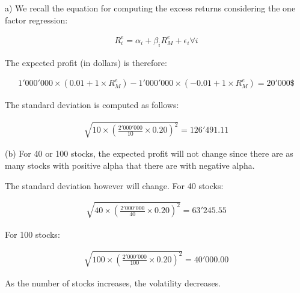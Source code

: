 \documentclass[10pt]{article}
\newenvironment{exercise}[2][Exercise]{\begin{trivlist}
  \item[\hskip \labelsep {\bfseries #1}\hskip \labelsep {\bfseries #2.}]}{\end{trivlist}}
\begin{document}
\begin{exercise}{2}

	(a) We recall the equation for computing the excess returns considering the one factor regression:
	
	\begin{align*}
		R_{i}^{e} = \alpha_{i} + \beta_{i}R_{M}^{e}  + \epsilon_{i} \forall i
	\end{align*}
	
	The expected profit (in dollars) is therefore:
	
	\begin{align*}
		1'000'000 \times (0.01 + 1 \times R_{M}^{e}) - 1'000'000 \times (	-0.01 + 1 \times R_{M}^{e}) = 20'000 \$
	\end{align*}		

	The standard deviation is computed as follows:
	
	\begin{align*}
		\sqrt{10 \times \left( \frac{2'000'000}{10} \times 0.20 \right)^{2}} = 126'491.11 
	\end{align*}

	(b) For 40 or 100 stocks, the expected profit will not change since there are as many stocks with positive alpha that there are with negative alpha.
	
	\smallbreak
	
	The standard deviation however will change. For 40 stocks:
	
	\begin{align*}
		\sqrt{40 \times \left( \frac{2'000'000}{40} \times 0.20 \right)^{2}} = 63'245.55
	\end{align*}
	
	For 100 stocks:
	
	\begin{align*}
		\sqrt{100 \times \left( \frac{2'000'000}{100} \times 0.20 \right)^{2}} = 40'000.00
	\end{align*}

	As the number of stocks increases, the volatility decreases.

\end{exercise}

\newpage
\end{document}
